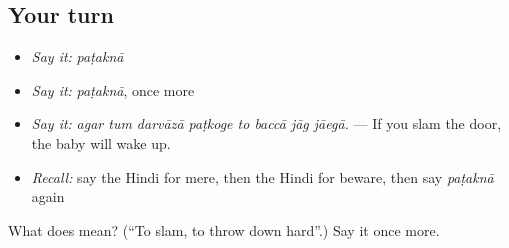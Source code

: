 \subsection*{Your turn}
\begin{itemize}
\raggedright
  \item \emph{Say it:} \emph{paṭaknā}
  \item \emph{Say it:} \emph{paṭaknā}, once more
  \item \emph{Say it:} \emph{agar tum darvāzā paṭkoge to baccā jāg jāegā.} — If you slam the door, the baby will wake up.
  \item \emph{Recall:} say the Hindi for mere, then the Hindi for beware, then say \emph{paṭaknā} again
\end{itemize}

\begin{tcolorbox}[breakable,colback=teal!4,colframe=teal!35!black,title={Before you move on}]
What does  mean? (\textquotedblleft{}To slam, to throw down hard\textquotedblright{}.) Say it once more.
\end{tcolorbox}
